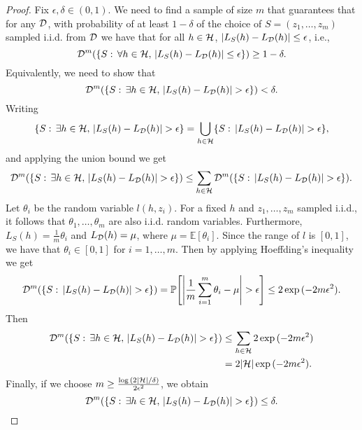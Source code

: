 \documentclass[11pt,a4paper]{article}
\begin{document}
\begin{proof}
Fix $\epsilon,\delta\in(0,1)$. We need to find a sample of size $m$ that guarantees that for any $\mathcal{D}$, with probability of at least $1-\delta$ of the choice of $S = (z_1,\ldots,z_m)$ sampled i.i.d. from $\mathcal{D}$ we have that for all $h\in\mathcal{H}$, $|L_S(h)-L_{\mathcal{D}}(h)|\le \epsilon$, i.e.,
\begin{equation*}
\mathcal{D}^m(\{S:\,\forall h\in\mathcal{H},\,|L_S(h)-L_{\mathcal{D}}(h)|\le \epsilon\}) \ge 1-\delta.
\end{equation*}
Equivalently, we need to show that 
\begin{equation*}
\Dist^m(\{S:\,\exists h\in\h,\,|L_S(h)-L_\Dist(h)|> \epsilon\}) < \delta.
\end{equation*}
Writing
\begin{equation*}
\{S:\,\exists h\in\h,\,|L_S(h)-L_\Dist(h)|> \epsilon\} = \bigcup_{h\in\h} \{S:\,|L_S(h)-L_\Dist(h)|> \epsilon\},
\end{equation*}
and applying the union bound we get
\begin{equation*}
\Dist^m(\{S:\,\exists h\in\h,\,|L_S(h)-L_\Dist(h)|> \epsilon\}) \le 
\sum_{h\in\h} \Dist^m(\{S:\,|L_S(h)-L_\Dist(h)|> \epsilon\}).
\end{equation*}
Let $\theta_i$ be the random variable $l(h,z_i)$. For a fixed $h$ and $z_1,\ldots,z_m$ sampled i.i.d., it follows that $\theta_1,\ldots,\theta_m$ are also i.i.d. random variables. Furthermore, $L_S(h) = \frac{1}{m}\theta_i$ and $L_{\mathcal{D}}(h) = \mu$, where $\mu = \mathbb{E}[\theta_i]$. Since the range of $l$ is $[0,1]$, we have that $\theta_i\in [0,1]$ for $i = 1,\ldots,m$. Then by applying Hoeffding's inequality we get
\begin{equation*}
\Dist^m(\{S:\,|L_S(h)-L_\Dist(h)|> \epsilon\}) = \Prob\Bigg[ \Bigg| \dfrac{1}{m}\sum_{i=1}^m\theta_i - \mu \Bigg|>\epsilon \Bigg] \le 2 \exp{(-2m\epsilon^2)}.
\end{equation*}
Then
\begin{align*}
\Dist^m(\{S:\,\exists h\in\h,\,|L_S(h)-L_\Dist(h)|> \epsilon\}) &\le 
\sum_{h\in\h} 2 \exp{(-2m\epsilon^2)} \\
&= 2|\h| \exp{(-2m\epsilon^2)}.
\end{align*}
Finally, if we choose $m\ge \frac{\log{(2|\mathcal{H}|/\delta)}}{2\epsilon^2}$, we obtain
\begin{equation*}
\Dist^m(\{S:\,\exists h\in\h,\,|L_S(h)-L_\Dist(h)|> \epsilon\}) \le \delta.
\end{equation*}
\end{proof}
\end{document}
